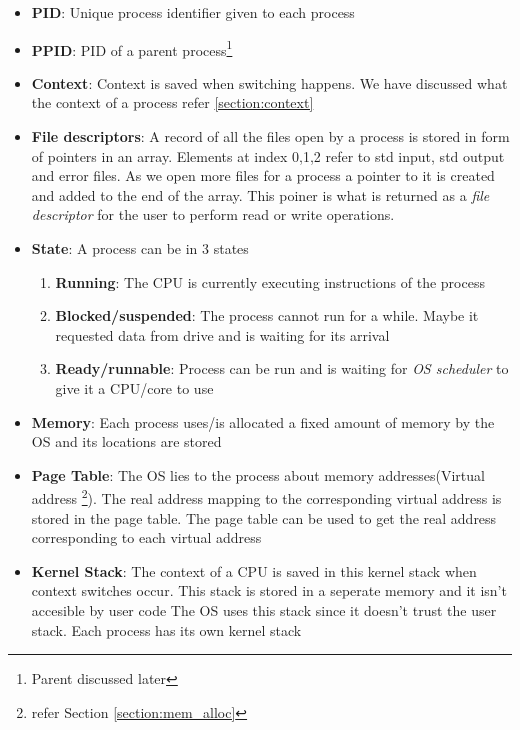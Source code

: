 \documentclass[12pt]{article}
\begin{document}
    \begin{itemize}[topsep=0pt, partopsep=0pt, itemsep=0pt, parsep=0pt]
        \item \textbf{PID}: Unique process identifier given to each process
        \item \textbf{PPID}: PID of a parent process\footnote{Parent discussed later}
        \item \textbf{Context}: Context is saved when switching happens. We have discussed what the context of a process refer \ref{section:context}
        \item \textbf{File descriptors}: A record of all the files open by a process is stored in form of pointers in 
        an array. Elements at index 0,1,2 refer to std input, std output and error files. As we open more files for
        a process a pointer to it is created and added to the end of the array. This poiner is what is returned as a 
        \textit{file descriptor} for the user to perform read or write operations.
        \item \textbf{State}: A process can be in 3 states
        \begin{enumerate}[topsep=0pt, partopsep=0pt, itemsep=0pt, parsep=0pt]
            \item \textbf{Running}: The CPU is currently executing instructions of the process
            \item \textbf{Blocked/suspended}: The process cannot run for a while. Maybe it requested data from drive and is waiting for its arrival
            \item \textbf{Ready/runnable}: Process can be run and is waiting for \textit{OS scheduler} to give it a CPU/core to use
        \end{enumerate}
        \item \textbf{Memory}: Each process uses/is allocated a fixed amount of memory by the OS and its locations are stored
        \item \textbf{Page Table}: The OS lies to the process about memory addresses(Virtual address \footnote{refer Section \ref{section:mem_alloc}}). The real address mapping to the corresponding
        virtual address is stored in the page table. The page table can be used to get the real address corresponding to each virtual address
        \item \textbf{Kernel Stack}: The context of a CPU is saved in this kernel stack when context switches occur. This stack is stored in a seperate memory and it isn't accesible by user code
        The OS uses this stack since it doesn't trust the user stack. Each process has its own kernel stack
    \end{itemize}
\end{document}
